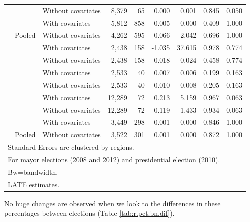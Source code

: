 \documentclass[
  12pt,
]{article}
\begin{document}
\begin{table}[H]
\begin{tabular}[t]{lllrrrrrr}
 & \multirow{-2}{*}{\raggedright\arraybackslash 60000} & Without covariates & 8,379 & 65 & 0.000 & 0.001 & 0.845 & 0.050\\


 &  & With covariates & 5,812 & 858 & -0.005 & 0.000 & 0.409 & 1.000\\


\multirow{-8}{*}{\raggedright\arraybackslash 2010} & Pooled & Without covariates & 4,262 & 595 & 0.066 & 2.042 & 0.696 & 1.000\\
\cmidrule{1-9}
 &  & With covariates & 2,438 & 158 & -1.035 & 37.615 & 0.978 & 0.774\\


 & \multirow{-2}{*}{\raggedright\arraybackslash 20000} & Without covariates & 2,438 & 158 & -0.018 & 0.024 & 0.458 & 0.774\\


 &  & With covariates & 2,533 & 40 & 0.007 & 0.006 & 0.199 & 0.163\\


 & \multirow{-2}{*}{\raggedright\arraybackslash 40000} & Without covariates & 2,533 & 40 & 0.010 & 0.008 & 0.205 & 0.163\\


 &  & With covariates & 12,289 & 72 & 0.213 & 5.159 & 0.967 & 0.063\\


 & \multirow{-2}{*}{\raggedright\arraybackslash 60000} & Without covariates & 12,289 & 72 & -0.119 & 1.433 & 0.934 & 0.063\\


 &  & With covariates & 3,449 & 298 & 0.001 & 0.000 & 0.846 & 1.000\\


\multirow{-8}{*}{\raggedright\arraybackslash 2012} & Pooled & Without covariates & 3,522 & 301 & 0.001 & 0.000 & 0.872 & 1.000\\
\bottomrule
\multicolumn{9}{l}{Standard Errors are clustered by regions.}\\
\multicolumn{9}{l}{For mayor elections (2008 and 2012) and presidential election (2010).}\\
\multicolumn{9}{l}{Bw=bandwidth.}\\
\multicolumn{9}{l}{LATE estimates.}\\
\end{tabular}
\end{table}

No huge changes are observed when we look to the differences in these
percentages between elections (Table \ref{tab:r.pct.bn.dif}).
\end{document}
